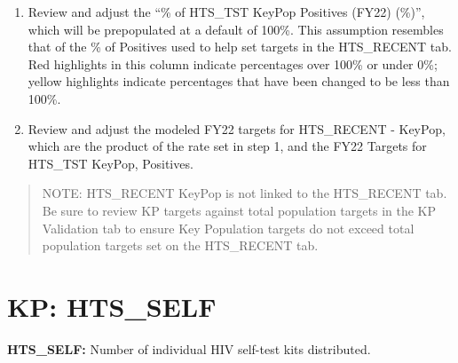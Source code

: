 \documentclass[
  openany]{book}
\begin{document}
\begin{enumerate}
\def\labelenumi{\arabic{enumi}.}
\item
  Review and adjust the ``\% of HTS\_TST KeyPop Positives (FY22) (\%)'',
  which will be prepopulated at a default of 100\%. This assumption
  resembles that of the \% of Positives used to help set targets in the
  HTS\_RECENT tab. Red highlights in this column indicate percentages
  over 100\% or under 0\%; yellow highlights indicate percentages that
  have been changed to be less than 100\%.
\item
  Review and adjust the modeled FY22 targets for HTS\_RECENT - KeyPop,
  which are the product of the rate set in step 1, and the FY22
  Targets for HTS\_TST KeyPop, Positives.
\end{enumerate}

\begin{quote}
NOTE: HTS\_RECENT KeyPop is not linked to the HTS\_RECENT tab. Be sure
to review KP targets against total population targets in the KP
Validation tab to ensure Key Population targets do not exceed total
population targets set on the HTS\_RECENT tab.
\end{quote}

\hypertarget{kp-hts_self}{%
\section{KP: HTS\_SELF}\label{kp-hts_self}}

\textbf{HTS\_SELF:} Number of individual HIV self-test kits distributed.

\begin{table}[H]
\centering\begingroup\fontsize{12}{14}\selectfont

\endgroup{}
\end{table}
\end{document}
